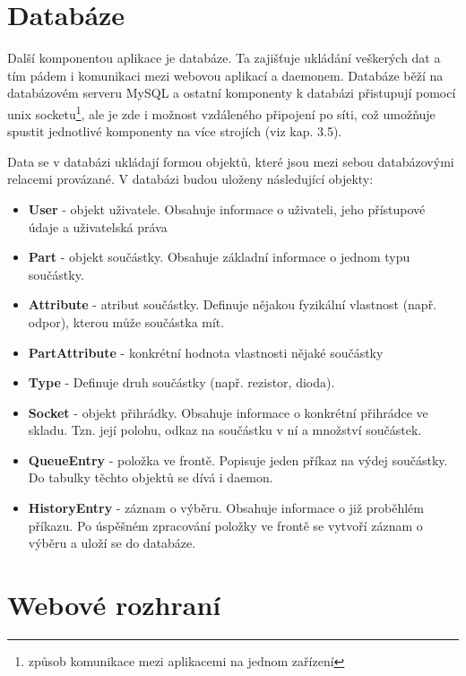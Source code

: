 \documentclass[12pt, a4paper, oneside]{article}
\begin{document}
\newpage

\section{Databáze}  %

Další komponentou aplikace je databáze. Ta zajišťuje ukládání veškerých dat a tím pádem i komunikaci mezi webovou aplikací a daemonem. Databáze běží na databázovém serveru MySQL a ostatní komponenty k databázi přistupují pomocí unix socketu\footnote{způsob komunikace mezi aplikacemi na jednom zařízení}, ale je zde i možnost vzdáleného připojení po síti, což umožňuje spustit jednotlivé komponenty na více strojích (viz kap. 3.5).

Data se v databázi ukládají formou objektů, které jsou mezi sebou databázovými relacemi provázané. V databázi budou uloženy následující objekty:

\begin{itemize}
\item \textbf{User} - objekt uživatele. Obsahuje informace o uživateli, jeho přístupové údaje a uživatelská práva
\item \textbf{Part} - objekt součástky. Obsahuje základní informace o jednom typu součástky.
\item \textbf{Attribute} - atribut součástky. Definuje nějakou fyzikální vlastnost (např. odpor), kterou může součástka mít.
\item \textbf{PartAttribute} - konkrétní hodnota vlastnosti nějaké součástky
\item \textbf{Type} - Definuje druh součástky (např. rezistor, dioda).
\item \textbf{Socket} - objekt přihrádky. Obsahuje informace o konkrétní přihrádce ve skladu. Tzn. její polohu, odkaz na součástku v ní a množství součástek.
\item \textbf{QueueEntry} - položka ve frontě. Popisuje jeden příkaz na výdej součástky. Do tabulky těchto objektů se dívá i daemon.
\item \textbf{HistoryEntry} - záznam o výběru. Obsahuje informace o již proběhlém příkazu. Po úspěšném zpracování položky ve frontě se vytvoří záznam o výběru a uloží se do databáze.
\end{itemize}

\newpage

\section{Webové rozhraní}  %
\end{document}
